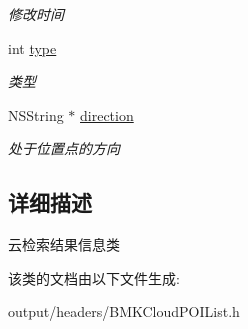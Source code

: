 \begin{DoxyCompactItemize}
\begin{DoxyCompactList}\small\item\em 修改时间 \end{DoxyCompactList}\item 
\hypertarget{interface_b_m_k_cloud_p_o_i_info_a7a51645c4ec8dcfa08ae4624749878cb}{}int \hyperlink{interface_b_m_k_cloud_p_o_i_info_a7a51645c4ec8dcfa08ae4624749878cb}{type}\label{interface_b_m_k_cloud_p_o_i_info_a7a51645c4ec8dcfa08ae4624749878cb}

\begin{DoxyCompactList}\small\item\em 类型 \end{DoxyCompactList}\item 
\hypertarget{interface_b_m_k_cloud_p_o_i_info_a63009d41eeb3c87a747928fababc7b63}{}N\+S\+String $\ast$ \hyperlink{interface_b_m_k_cloud_p_o_i_info_a63009d41eeb3c87a747928fababc7b63}{direction}\label{interface_b_m_k_cloud_p_o_i_info_a63009d41eeb3c87a747928fababc7b63}

\begin{DoxyCompactList}\small\item\em 处于位置点的方向 \end{DoxyCompactList}\end{DoxyCompactItemize}


\subsection{详细描述}
云检索结果信息类 

该类的文档由以下文件生成\+:\begin{DoxyCompactItemize}
\item 
output/headers/B\+M\+K\+Cloud\+P\+O\+I\+List.\+h\end{DoxyCompactItemize}
